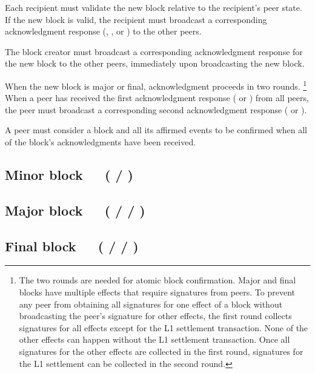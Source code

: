 \documentclass[../hydrozoa.tex]{subfiles}
\begin{document}
Each recipient must validate the new block relative to the recipient's peer state. If the new block is valid, the recipient must broadcast a corresponding acknowledgment response (, , or ) to the other peers.

The block creator must broadcast a corresponding acknowledgment response for the new block to the other peers, immediately upon broadcasting the new block.

When the new block is major or final, acknowledgment proceeds in two rounds.%
\footnote{The two rounds are needed for atomic block confirmation.
  Major and final blocks have multiple effects that require signatures from peers.
  To prevent any peer from obtaining all signatures for one effect of a block without broadcasting the peer's signature for other effects, the first round collects signatures for all effects except for the L1 settlement transaction.
  None of the other effects can happen without the L1 settlement transaction.
  Once all signatures for the other effects are collected in the first round, signatures for the L1 settlement can be collected in the second round.
  }
When a peer has received the first acknowledgment response ( or ) from all peers, the peer must broadcast a corresponding second acknowledgment response ( or ).

A peer must consider a block and all its affirmed events to be confirmed when all of the block's acknowledgments have been received.

\subsection{Minor block~~~( / )}%
\label{h:l2-consensus-minor-block}%


\subsection{Major block~~~( /  / )}%
\label{h:l2-consensus-major-block}%


\subsection{Final block~~~( /  / )}%
\label{h:l2-consensus-final-block}%
\end{document}
